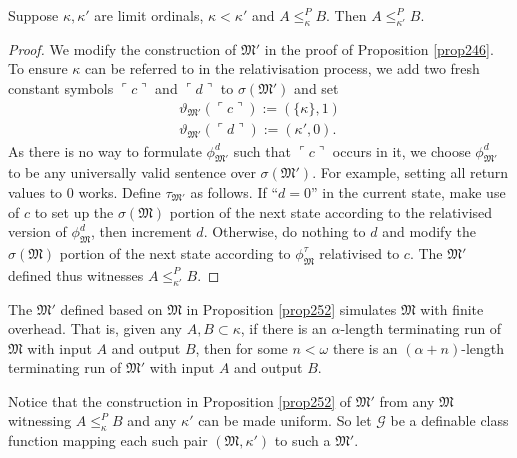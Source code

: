 \documentclass[12pt]{article}
\numberwithin{equation}{section}
\begin{document}
\begin{prop}\label{prop252}
Suppose $\kappa, \kappa'$ are limit ordinals, $\kappa < \kappa'$ and $A \leq^P_{\kappa} B$. Then $A \leq^P_{\kappa'} B$.
\end{prop}

\begin{proof}
We modify the construction of $\mathfrak{M}'$ in the proof of Proposition \ref{prop246}. To ensure $\kappa$ can be referred to in the relativisation process, we add two fresh constant symbols $\ulcorner c \urcorner$ and $\ulcorner d \urcorner$ to $\sigma(\mathfrak{M'})$ and set
\begin{gather*}
    \vartheta_{\mathfrak{M}'}(\ulcorner c \urcorner) := (\{\kappa\}, 1) \\
    \vartheta_{\mathfrak{M}'}(\ulcorner d \urcorner) := (\kappa', 0) \text{.}
\end{gather*}
As there is no way to formulate $\phi^d_{\mathfrak{M}'}$ such that $\ulcorner c \urcorner$ occurs in it, we choose $\phi^d_{\mathfrak{M}'}$ to be any universally valid sentence over $\sigma(\mathfrak{M'})$. For example, setting all return values to $0$ works. Define $\tau_{\mathfrak{M}'}$ as follows. If ``$d = 0$'' in the current state, make use of $c$ to set up the $\sigma(\mathfrak{M})$ portion of the next state according to the relativised version of $\phi^d_{\mathfrak{M}}$, then increment $d$. Otherwise, do nothing to $d$ and modify the $\sigma(\mathfrak{M})$ portion of the next state according to $\phi^{\tau}_{\mathfrak{M}}$ relativised to $c$. The $\mathfrak{M}'$ defined thus witnesses $A \leq^P_{\kappa'} B$.
\end{proof}

\begin{rem}\label{rem256}
The $\mathfrak{M}'$ defined based on $\mathfrak{M}$ in Proposition \ref{prop252} simulates $\mathfrak{M}$ with finite overhead. That is, given any $A, B \subset \kappa$, if there is an $\alpha$-length terminating run of $\mathfrak{M}$ with input $A$ and output $B$, then for some $n < \omega$ there is an $(\alpha + n)$-length terminating run of $\mathfrak{M}'$ with input $A$ and output $B$.
\end{rem}

Notice that the construction in Proposition \ref{prop252} of $\mathfrak{M}'$ from any $\mathfrak{M}$ witnessing $A \leq^P_{\kappa} B$ and any $\kappa'$ can be made uniform. So let $\mathcal{G}$ be a definable class function mapping each such pair $(\mathfrak{M}, \kappa')$ to such a $\mathfrak{M}'$.
\end{document}
